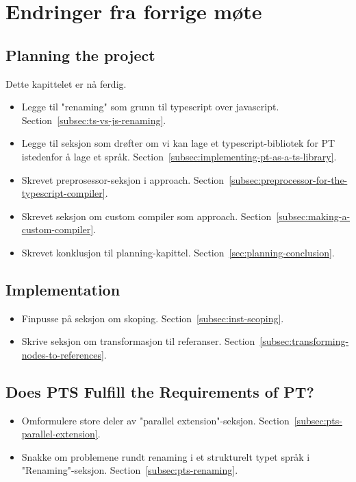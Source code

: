 
\chapter*{Endringer fra forrige møte}

\section*{Planning the project}

Dette kapittelet er nå ferdig.

\begin{itemize}
    \item Legge til "renaming" som grunn til typescript over javascript.
    Section~\vref{subsec:ts-vs-js-renaming}.
    \item Legge til seksjon som drøfter om vi kan lage et typescript-bibliotek for PT istedenfor å lage et språk.
    Section~\vref{subsec:implementing-pt-as-a-ts-library}.
    \item Skrevet preprosessor-seksjon i approach.
    Section~\vref{subsec:preprocessor-for-the-typescript-compiler}.
    \item Skrevet seksjon om custom compiler som approach.
    Section~\vref{subsec:making-a-custom-compiler}.
    \item Skrevet konklusjon til planning-kapittel.
    Section~\vref{sec:planning-conclusion}.
\end{itemize}

\section*{Implementation}

\begin{itemize}
    \item Finpusse på seksjon om skoping.
    Section~\vref{subsec:inst-scoping}.
    \item Skrive seksjon om transformasjon til referanser.
    Section~\vref{subsec:transforming-nodes-to-references}.
\end{itemize}

\section*{Does PTS Fulfill the Requirements of PT?}

\begin{itemize}
    \item Omformulere store deler av "parallel extension"-seksjon.
    Section~\vref{subsec:pts-parallel-extension}.
    \item Snakke om problemene rundt renaming i et strukturelt typet språk i "Renaming"-seksjon.
    Section~\vref{subsec:pts-renaming}.
\end{itemize}
